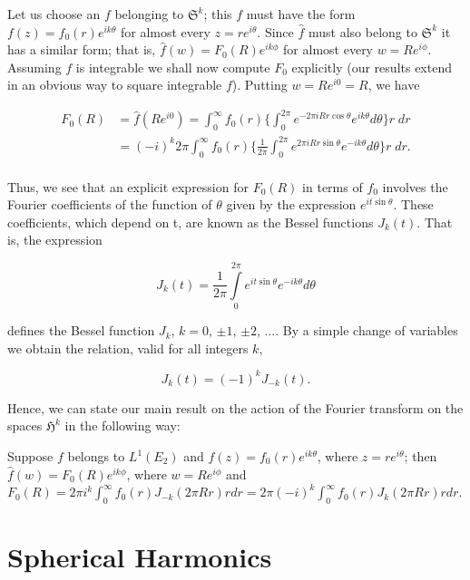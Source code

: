 Let us choose an $f$ belonging to $\mathfrak{S}^k$; this $f$ must have the form $f(z) = f_0(r)e^{ik\theta}$ for almost every $z = re^{i\theta}$. Since $\hat{f}$ must also belong to $\mathfrak{S}^k$ it has a similar form; that is, $\hat{f}(w) = F_0(R)e^{ik\phi}$ for almost every $w = Re^{i\phi}$. Assuming $f$ is integrable we shall now compute $F_0$ explicitly (our results extend in an obvious way to square integrable $f$). Putting $w = Re^{i0} = R$, we have

\[
\begin{aligned}{F_{0}(R)}&{{}=\hat{f}(Re^{i0})=\int_{0}^{\infty}f_{0}(r)\Biggl\{\int_{0}^{2\pi}e^{-2\pi i R r\cos\theta}e^{i k\theta}d\theta\Biggr\}r\;d r}\\ {}&{{}=(-i)^{k}2\pi\int_{0}^{\infty}f_{0}(r)\Biggl\{\frac{1}{2\pi}\int_{0}^{2\pi}e^{2\pi i R r\sin\theta}e^{-i k\theta}d\theta\Biggr\}r\;d r.}\\ \end{aligned}
\]

Thus, we see that an explicit expression for $F_0(R)$ in terms of $f_0$ involves the Fourier coefficients of the function of $\theta$ given by the expression $e^{i t \sin \theta}$. These coefficients, which depend on t, are known as the Bessel functions $J_k(t)$. That is, the expression

\[
J_{k}(t) = \frac{1}{2\pi} \int\limits_{0}^{2\pi}e^{i t\sin\theta}e^{-i k\theta} d\theta
\]

defines the Bessel function $J_k$, $k = 0$, $\pm 1$, $\pm 2$, $\ldots$. By a simple change of variables we obtain the relation, valid for all integers $k$,

\begin{equation}\label{eq:c4-1-5}
J_{k}(t)=(-1)^{k}J_{-k}(t).
\end{equation}

Hence, we can state our main result on the action of the Fourier transform on the spaces $\mathfrak{H}^k$ in the following way:

\begin{theorem}
\label{thm:c4-1-6}
Suppose $f$ belongs to $L^{1}(E_{2})$ and $f(z)=f_{0}(r)e^{ik\theta}$, where $z=re^{i\theta}$; then $\hat{f}(w)=F_{0}(R)e^{ik\phi}$, where $w=Re^{i\phi}$ and $F_{0}(R)=2\pi i^{k}\int_{0}^{\infty}f_{0}(r)J_{-k}(2\pi Rr)r dr=2\pi(-i)^{k}\int_{0}^{\infty}f_{0}(r)J_{k}(2\pi Rr)r dr$.
\end{theorem}

\section{Spherical Harmonics}

